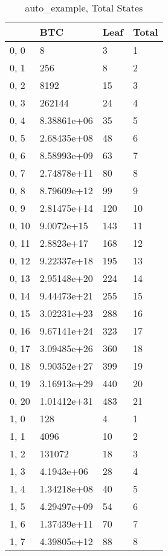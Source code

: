 \begin{table}
\centering
\caption{auto_example, Total States}
\label{auto_example_total}
\begin{tabular}{llll}
\toprule
{} &          BTC & Leaf & Total \\
\midrule
0, 0   &            8 &    3 &     1 \\
0, 1   &          256 &    8 &     2 \\
0, 2   &         8192 &   15 &     3 \\
0, 3   &       262144 &   24 &     4 \\
0, 4   &  8.38861e+06 &   35 &     5 \\
0, 5   &  2.68435e+08 &   48 &     6 \\
0, 6   &  8.58993e+09 &   63 &     7 \\
0, 7   &  2.74878e+11 &   80 &     8 \\
0, 8   &  8.79609e+12 &   99 &     9 \\
0, 9   &  2.81475e+14 &  120 &    10 \\
0, 10  &   9.0072e+15 &  143 &    11 \\
0, 11  &   2.8823e+17 &  168 &    12 \\
0, 12  &  9.22337e+18 &  195 &    13 \\
0, 13  &  2.95148e+20 &  224 &    14 \\
0, 14  &  9.44473e+21 &  255 &    15 \\
0, 15  &  3.02231e+23 &  288 &    16 \\
0, 16  &  9.67141e+24 &  323 &    17 \\
0, 17  &  3.09485e+26 &  360 &    18 \\
0, 18  &  9.90352e+27 &  399 &    19 \\
0, 19  &  3.16913e+29 &  440 &    20 \\
0, 20  &  1.01412e+31 &  483 &    21 \\
1, 0   &          128 &    4 &     1 \\
1, 1   &         4096 &   10 &     2 \\
1, 2   &       131072 &   18 &     3 \\
1, 3   &   4.1943e+06 &   28 &     4 \\
1, 4   &  1.34218e+08 &   40 &     5 \\
1, 5   &  4.29497e+09 &   54 &     6 \\
1, 6   &  1.37439e+11 &   70 &     7 \\
1, 7   &  4.39805e+12 &   88 &     8 \\

\end{tabular}
\end{table}
